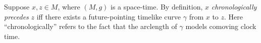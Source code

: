 Suppose $x, z \in M$, where $(M, g)$ is a space-time. By definition, $x$ \emph{chronologically precedes} $z$ iff there exists a future-pointing timelike curve $\gamma$ from $x$ to $z$. Here ``chronologically'' refers to the fact that the arclength of $\gamma$ models comoving clock time.

